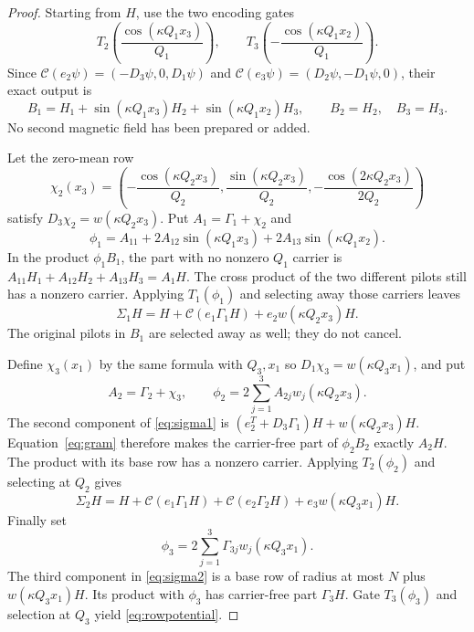 \documentclass[11pt,a4paper]{amsart}
\theoremstyle{definition}
\theoremstyle{remark}
\numberwithin{equation}{section}
\begin{document}
\begin{proof}
Starting from $H$, use the two encoding gates
\[
 T_2\left(\frac{\cos(\kappa Q_1x_3)}{Q_1}\right),\qquad
 T_3\left(-\frac{\cos(\kappa Q_1x_2)}{Q_1}\right).
\]
Since $\mathscr C(e_2\psi)=(-D_3\psi,0,D_1\psi)$ and
$\mathscr C(e_3\psi)=(D_2\psi,-D_1\psi,0)$, their exact output is
\begin{equation}\label{eq:encode}
 B_1=H_1+\sin(\kappa Q_1x_3)H_2+\sin(\kappa Q_1x_2)H_3,
 \qquad B_2=H_2,\quad B_3=H_3.
\end{equation}
No second magnetic field has been prepared or added.

Let the zero-mean row
\[
 \chi_2(x_3)=\left(-\frac{\cos(\kappa Q_2x_3)}{Q_2},
 \frac{\sin(\kappa Q_2x_3)}{Q_2},
 -\frac{\cos(2\kappa Q_2x_3)}{2Q_2}\right)
\]
satisfy $D_3\chi_2=w(\kappa Q_2x_3)$. Put $A_1=\Gamma_1+\chi_2$ and
\begin{equation}\label{eq:phi1}
 \phi_1=A_{11}+2A_{12}\sin(\kappa Q_1x_3)
                    +2A_{13}\sin(\kappa Q_1x_2).
\end{equation}
In the product $\phi_1B_1$, the part with no nonzero $Q_1$ carrier is
$A_{11}H_1+A_{12}H_2+A_{13}H_3=A_1H$.
The cross product of the two different pilots still has a nonzero carrier.
Applying $T_1(\phi_1)$ and selecting away those carriers leaves
\begin{equation}\label{eq:sigma1}
 \Sigma_1H=H+\mathscr C(e_1\Gamma_1H)
                         +e_2w(\kappa Q_2x_3)H.
\end{equation}
The original pilots in $B_1$ are selected away as well; they do not cancel.

Define $\chi_3(x_1)$ by the same formula with $Q_3,x_1$ so
$D_1\chi_3=w(\kappa Q_3x_1)$, and put
\begin{equation}\label{eq:phi2}
 A_2=\Gamma_2+\chi_3,\qquad
 \phi_2=2\sum_{j=1}^3A_{2j}w_j(\kappa Q_2x_3).
\end{equation}
The second component of \eqref{eq:sigma1} is
$(e_2^T+D_3\Gamma_1)H+w(\kappa Q_2x_3)H$.
Equation~\eqref{eq:gram} therefore makes the carrier-free part of
$\phi_2B_2$ exactly $A_2H$. The product with its base row has a nonzero
carrier. Applying $T_2(\phi_2)$ and selecting at $Q_2$ gives
\begin{equation}\label{eq:sigma2}
 \Sigma_2H=H+\mathscr C(e_1\Gamma_1H)+\mathscr C(e_2\Gamma_2H)
                         +e_3w(\kappa Q_3x_1)H.
\end{equation}
Finally set
\begin{equation}\label{eq:phi3}
 \phi_3=2\sum_{j=1}^3\Gamma_{3j}w_j(\kappa Q_3x_1).
\end{equation}
The third component in \eqref{eq:sigma2} is a base row of radius at most
$N$ plus $w(\kappa Q_3x_1)H$. Its product with $\phi_3$ has carrier-free
part $\Gamma_3H$. Gate $T_3(\phi_3)$ and selection at $Q_3$ yield
\eqref{eq:rowpotential}.


\end{proof}
\end{document}

